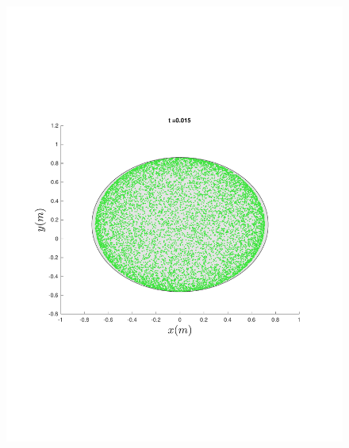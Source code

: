 \begin{figure}
{\begin{minipage}{0.5\textwidth}
\begin{minipage}[b]{0.5\textwidth}
        \includegraphics[width=\textwidth]{figures/method/FunnelSimOverlaid3funnel-1}
      \end{minipage}%
      \\
      \begin{minipage}[b]{0.5\textwidth}

\end{minipage}
\end{minipage}}
\end{figure}

